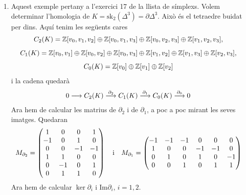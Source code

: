 \documentclass[../main.tex]{subfiles}
\begin{document}
\begin{ej}
\begin{enumerate}[(1)]
    \item Aquest exemple pertany a l'exercici 17 de la llista de símplexs. Volem determinar l'homologia de $K = \mathrm{sk}_2(\Delta^3) = \partial\Delta^3$. Això és el tetraedre buidat per dins. Aquí tenim les següents cares
    \begin{equation}
        \notag
        C_2(K) = \mathbb{Z}[v_0,v_1,v_2]\oplus\mathbb{Z}[v_0,v_1,v_3]\oplus\mathbb{Z}[v_0,v_2,v_3]\oplus\mathbb{Z}[v_1,v_2,v_3],
    \end{equation}
    \begin{equation}
        \notag
        C_1(K) = \mathbb{Z}[v_0,v_1]\oplus\mathbb{Z}[v_0,v_2]\oplus\mathbb{Z}[v_0,v_3]\oplus\mathbb{Z}[v_1,v_2]\oplus\mathbb{Z}[v_1,v_3]\oplus\mathbb{Z}[v_2,v_3],
    \end{equation}
    \begin{equation}
        \notag
        C_0(K) = \mathbb{Z}[v_0]\oplus\mathbb{Z}[v_1]\oplus\mathbb{Z}[v_2]
    \end{equation}
    i la cadena quedarà
    \begin{equation}
        \notag
        0\longrightarrow C_2(K)\overset{\partial_2}{\longrightarrow} C_1(K)\overset{\partial_1}{\longrightarrow} C_0(K)\overset{\partial_0}{\longrightarrow}0
    \end{equation}
    Ara hem de calcular les matrius de $\partial_2$ i de $\partial_1$, a poc a poc mirant les seves imatges. Quedaran
    \begin{equation}
        \notag
        M_{\partial_2} = \begin{pmatrix}
            1 & 0 & 0 & 1\\
            -1 & 0 & 1 & 0 \\
            0 & 0 & -1 & -1 \\
            1 & 1 & 0 & 0 \\
            0 & -1 & 0 & 1 \\
            0 & 1 & 1 & 0 
        \end{pmatrix}
        \quad \text{i}\quad M_{\partial_1} = \begin{pmatrix}
            -1 & -1 & -1 & 0 & 0 & 0 \\
            1 & 0 & 0 & -1 & -1 & 0 \\
            0 & 1 & 0 & 1 & 0 & -1 \\
            0 & 0 & 1 & 0 & 1 & 1 
        \end{pmatrix}
    \end{equation}
    Ara hem de calcular $\ker\partial_i$ i $\mathrm{Im}\partial_i$, $i = 1,2$.
    

\end{enumerate}
\end{ej}
\end{document}
